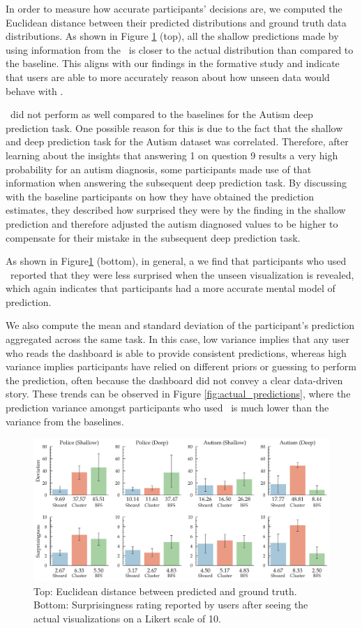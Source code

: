  In order to measure how accurate participants' decisions are, we computed the Euclidean distance between their predicted distributions and ground truth data distributions. As shown in Figure \ref{fig:distance} (top), all the shallow predictions made by using information from the \system\ is closer to the actual distribution than compared to the baseline. This aligns with our findings in the formative study and indicate that users are able to more accurately reason about how unseen data would behave with \system.
\par \system\ did not perform as well compared to the baselines for the Autism deep prediction task. One possible reason for this is due to the fact that the shallow and deep prediction task for the Autism dataset was correlated. Therefore, after learning about the insights that answering 1 on question 9 results a very high probability for an autism diagnosis, some participants made use of that information when answering the subsequent deep prediction task. By discussing with the baseline participants on how they have obtained the prediction estimates, they described how surprised they were by the finding in the shallow prediction and therefore adjusted the autism diagnosed values to be higher to compensate for their mistake in the subsequent deep prediction task. 
\par As shown in Figure\ref{fig:distance} (bottom), in general, a we find that participants who used \system\ reported that they were less surprised when the unseen visualization is revealed, which again indicates that participants had a more accurate mental model of prediction.
\par We also compute the mean and standard deviation of the participant's prediction aggregated across the same task. In this case, low variance implies that any user who reads the dashboard is able to provide consistent predictions, whereas high variance implies participants have relied on different priors or guessing to perform the prediction, often because the dashboard did not convey a clear data-driven story. These trends can be observed in Figure \ref{fig:actual_predictions}, where the prediction variance amongst participants who used \system\ is much lower than the variance from the baselines.
\begin{figure}[bht]
\centering
\includegraphics[width=\linewidth]{figures/Devation_Surprisingness.pdf}
\caption{Top: Euclidean distance between predicted and ground truth. Bottom: Surprisingness rating reported by users after seeing the actual visualizations on a Likert scale of 10.}
\label{fig:distance}
\end{figure}
